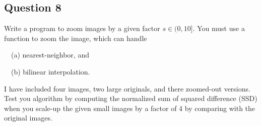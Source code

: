 \documentclass[10pt]{article}
\begin{document}
    \begin{center}
    \end{center}
    
    \begin{center}
    \end{center}
    
    \begin{center}
    \end{center}
    

\subsection{Question 8}\label{question-8}

Write a program to zoom images by a given factor \(s \in (0, 10]\). You
must use a function to zoom the image, which can handle

~~(a) nearest-neighbor, and

~~(b) bilinear interpolation.

I have included four images, two large originals, and there zoomed-out
versions. Test you algorithm by computing the normalized sum of squared
difference (SSD) when you scale-up the given small images by a factor of
4 by comparing with the original images.
\end{document}
